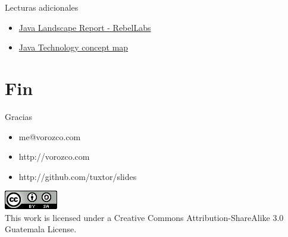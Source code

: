 \documentclass{beamer}
\begin{document}
\begin{frame}{Lecturas adicionales}
	\begin{itemize}
		\item \href{http://zeroturnaround.com/rebellabs/java-tools-and-technologies-landscape-for-2014/}{Java Landscape Report - RebelLabs}
		\item\href{http://www.oracle.com/technetwork/topics/newtojava/intro-142494.html}{Java Technology concept map}
	\end{itemize}
\end{frame}


\section{Fin}

\begin{frame}{Gracias}
\begin{itemize}
\item me@vorozco.com
\item http://vorozco.com
\item http://github.com/tuxtor/slides
\end{itemize}
\begin{center}
\includegraphics[width=0.1\linewidth]{Images/cclogo}
\\
This work is licensed under a Creative Commons Attribution-ShareAlike 3.0 Guatemala License.
\end{center}
\end{frame}
\end{document}
